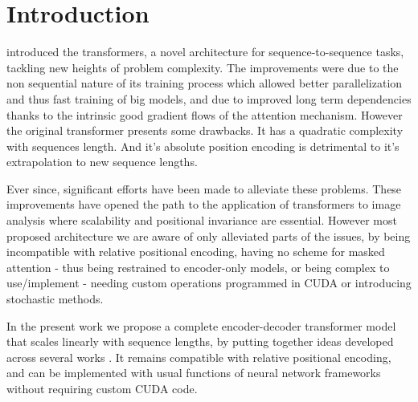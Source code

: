 \section{\label{sec:introduction}Introduction}

\citet{vaswani2017attention} introduced the transformers, a novel architecture for sequence-to-sequence tasks, tackling new heights of problem complexity. The improvements were due to the non sequential nature of its training process which allowed better parallelization and thus fast training of big models, and due to improved long term dependencies thanks to the intrinsic good gradient flows of the attention mechanism. However the original transformer presents some drawbacks. It has a quadratic complexity with sequences length. And it's absolute position encoding is detrimental to it's extrapolation to new sequence lengths.

Ever since, significant efforts have been made to alleviate these problems. These improvements have opened the path to the application of transformers to image analysis where scalability and positional invariance are essential. However most proposed architecture we are aware of only alleviated parts of the issues, by being incompatible with relative positional encoding, having no scheme for masked attention - thus being restrained to encoder-only models, or being complex to use/implement - needing custom operations programmed in CUDA or introducing stochastic methods.

In the present work we propose a complete encoder-decoder transformer model that scales linearly with sequence lengths, by putting together ideas developed across several works \cite{vaswani2017attention,shen2020efficient,katharopoulos2020transformers,choromanski2021rethinking,shaw2018selfattention,horn2021translational}. It remains compatible with relative positional encoding, and can be implemented with usual functions of neural network frameworks without requiring custom CUDA code.

\endinput
